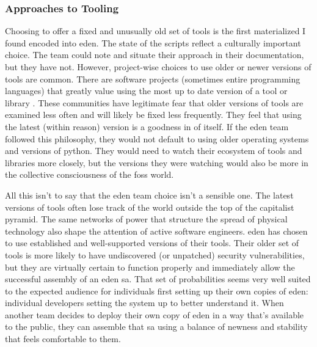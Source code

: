 \documentclass[a4paper,man,natbib,floatsintext]{apa6}
\begin{document}
   \subsubsection{Approaches to Tooling}
   Choosing to offer a fixed and unusually old set of tools is the first materialized I found encoded into \acrshort{eden}. The state of the scripts reflect a culturally important choice. The team could note and situate their approach in their documentation, but they have not. However, project-wise choices to use older or newer versions of tools are common. There are software projects (sometimes entire programming languages) that greatly value using the most up to date version of a tool or library \citep{Fernandes_da_Costa2017-mh}. These communities have legitimate fear that older versions of tools are examined less often and will likely be fixed less frequently. They feel that using the latest (within reason) version is a goodness in of itself. If the \acrshort{eden} team followed this philosophy, they would not default to using older operating systems and versions of \gls{python}. They would need to watch their ecosystem of tools and libraries more closely, but the versions they were watching would also be more in the collective consciousness of the \acrshort{foss} world. 

   All this isn't to say that the \acrshort{eden} team choice isn't a sensible one. The latest versions of tools often lose track of the world outside the top of the capitalist pyramid. The same networks of power that structure the spread of physical technology also shape the attention of active software engineers. \acrshort{eden} has chosen to use established and well-supported versions of their tools. Their older set of tools is more likely to have undiscovered (or unpatched) security vulnerabilities, but they are virtually certain to function properly and immediately allow the successful assembly of an \acrshort{eden} \gls{sa}. That set of probabilities seems very well suited to the expected audience for individuals first setting up their own copies of \acrshort{eden}: individual developers setting the system up to better understand it. When another team decides to deploy their own copy of \acrshort{eden} in a way that's available to the public, they can assemble that \gls{sa} using a balance of newness and stability that feels comfortable to them. 
\end{document}
